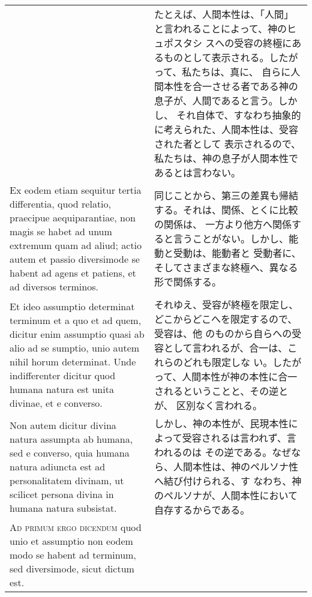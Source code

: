 \documentclass[10pt]{jsarticle} %
\begin{document}
\begin{longtable}{p{21em}p{21em}}
&

たとえば、人間本性は、「人間」と言われることによって、神のヒュポスタシ
スへの受容の終極にあるものとして表示される。したがって、私たちは、真に、
自らに人間本性を合一させる者である神の息子が、人間であると言う。しかし、
それ自体で、すなわち抽象的に考えられた、人間本性は、受容された者として
表示されるので、私たちは、神の息子が人間本性であるとは言わない。


\\

Ex eodem etiam sequitur tertia differentia, quod relatio, praecipue
aequiparantiae, non magis se habet ad unum extremum quam ad aliud;
actio autem et passio diversimode se habent ad agens et patiens, et ad
diversos terminos.


&

同じことから、第三の差異も帰結する。それは、関係、とくに比較の関係は、
一方より他方へ関係すると言うことがない。しかし、能動と受動は、能動者と
受動者に、そしてさまざまな終極へ、異なる形で関係する。


\\

Et ideo assumptio determinat terminum et a quo et ad quem, dicitur
enim assumptio quasi ab alio ad se sumptio, unio autem nihil horum
determinat. Unde indifferenter dicitur quod humana natura est unita
divinae, et e converso.


&

それゆえ、受容が終極を限定し、どこからどこへを限定するので、受容は、他
のものから自らへの受容として言われるが、合一は、これらのどれも限定しな
い。したがって、人間本性が神の本性に合一されるということと、その逆とが、
区別なく言われる。

\\

Non autem dicitur divina natura assumpta ab humana, sed e converso,
quia humana natura adiuncta est ad personalitatem divinam, ut scilicet
persona divina in humana natura subsistat.


&

しかし、神の本性が、民現本性によって受容されるは言われず、言われるのは
その逆である。なぜなら、人間本性は、神のペルソナ性へ結び付けられる、す
なわち、神のペルソナが、人間本性において自存するからである。

\\



{\scshape Ad primum ergo dicendum} quod unio et assumptio non eodem
modo se habent ad terminum, sed diversimode, sicut dictum est.



\end{longtable}
\end{document}
